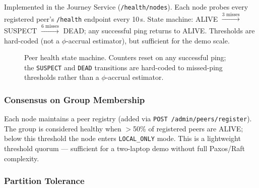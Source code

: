 \documentclass[11pt,a4paper]{article}
\begin{document}
Implemented in the Journey Service (\texttt{/health/nodes}). Each node probes every registered peer's \texttt{/health} endpoint every 10\,s. State machine: ALIVE $\xrightarrow{\text{3 misses}}$ SUSPECT $\xrightarrow{\text{6 misses}}$ DEAD; any successful ping returns to ALIVE. Thresholds are hard-coded (not a $\phi$-accrual estimator), but sufficient for the demo scale.

\begin{figure}[H]
\centering
{}
\caption{Peer health state machine. Counters reset on any successful
ping; the \texttt{SUSPECT} and \texttt{DEAD} transitions are hard-coded
to missed-ping thresholds rather than a $\phi$-accrual estimator.}
\label{fig:health-sm}
\end{figure}
 
\subsubsection{Consensus on Group Membership}

Each node maintains a peer registry (added via \texttt{POST /admin/peers/register}). The group is considered healthy when $>$50\% of registered peers are ALIVE; below this threshold the node enters \texttt{LOCAL\_ONLY} mode. This is a lightweight threshold quorum — sufficient for a two-laptop demo without full Paxos/Raft complexity.

\subsubsection{Partition Tolerance}
\end{document}
